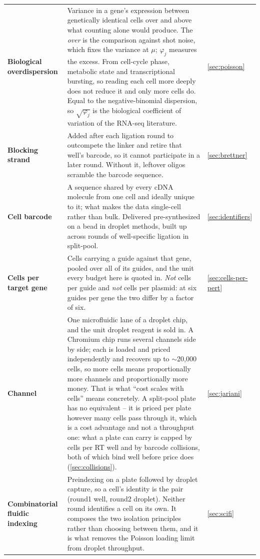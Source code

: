 \begin{longtable}{@{}>{\raggedright\arraybackslash}p{}>{\raggedright\arraybackslash}p{}>{\raggedright\arraybackslash}p{}@{}}
\addlinespace[5pt]
\textbf{Biological overdispersion}\newline {\color{tcgray}($\varphi_j$)} & Variance in a gene's expression between genetically identical cells over and above what counting alone would produce. The \emph{over} is the comparison against shot noise, which fixes the variance at $\mu$; $\varphi_j$ measures the excess. From cell-cycle phase, metabolic state and transcriptional bursting, so reading each cell more deeply does not reduce it and only more cells do. Equal to the negative-binomial dispersion, so $\sqrt{\varphi_j}$ is the biological coefficient of variation of the RNA-seq literature. & \cref{sec:poisson} \\
\addlinespace[5pt]
\textbf{Blocking strand} & Added after each ligation round to outcompete the linker and retire that well's barcode, so it cannot participate in a later round. Without it, leftover oligos scramble the barcode sequence. & \cref{sec:brettner} \\
\addlinespace[5pt]
\textbf{Cell barcode}\newline {\color{tcgray}(CB)} & A sequence shared by every cDNA molecule from one cell and ideally unique to it; what makes the data single-cell rather than bulk. Delivered pre-synthesized on a bead in droplet methods, built up across rounds of well-specific ligation in split-pool. & \cref{sec:identifiers} \\
\addlinespace[5pt]
\textbf{Cells per target gene} & Cells carrying a guide against that gene, pooled over all of its guides, and the unit every budget here is quoted in. \emph{Not} cells per guide and \emph{not} cells per plasmid: at six guides per gene the two differ by a factor of six. & \cref{sec:cells-per-pert} \\
\addlinespace[5pt]
\textbf{Channel} & One microfluidic lane of a droplet chip, and the unit droplet reagent is sold in. A Chromium chip runs several channels side by side; each is loaded and priced independently and recovers up to $\sim$20{,}000 cells, so more cells means proportionally more channels and proportionally more money. That is what ``cost scales with cells'' means concretely. A split-pool plate has no equivalent -- it is priced per plate however many cells pass through it, which is a cost advantage and not a throughput one: what a plate can carry is capped by cells per RT well and by barcode collisions, both of which bind well before price does (\cref{sec:collisions}). & \cref{sec:jariani} \\
\addlinespace[5pt]
\textbf{Combinatorial fluidic indexing}\newline {\color{tcgray}(scifi)} & Preindexing on a plate followed by droplet capture, so a cell's identity is the pair (round1 well, round2 droplet). Neither round identifies a cell on its own. It composes the two isolation principles rather than choosing between them, and it is what removes the Poisson loading limit from droplet throughput. & \cref{sec:scifi} \\

\end{longtable}
